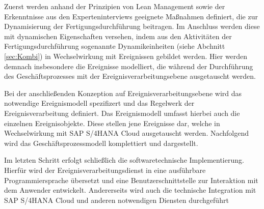\newpage

Zuerst werden anhand der Prinzipien von Lean Management sowie der Erkenntnisse aus den Experteninterviews geeignete Maßnahmen definiert, die zur Dynamisierung der Fertigungsdurchführung beitragen.
Im Anschluss werden diese mit dynamischen Eigenschaften versehen, indem aus den Aktivitäten der Fertigungsdurchführung sogenannte Dynamikeinheiten (siehe Abchnitt \ref{sec:Kombi}) in Wechselwirkung mit Ereignissen gebildet werden. Hier werden demnach insbesondere die Ereignisse modelliert, die während der Durchführung des Geschäftsprozesses mit der Ereignisverarbeitungsebene ausgetauscht werden.

Bei der anschließenden Konzeption auf Ereignisverarbeitungsebene  wird das notwendige Ereignismodell spezifizert und das Regelwerk der Ereignisverarbeitung definiert. Das Ereignismodell umfasst hierbei auch die einzelnen Ereignisobjekte. Diese stellen jene Ereignisse dar, welche in Wechselwirkung mit SAP S/4HANA Cloud ausgetauscht werden. Nachfolgend wird das Geschäftsprozessmodell komplettiert und dargestellt.

Im letzten Schritt erfolgt schließlich die softwaretechnische Implementierung. Hierfür wird der Ereignisverarbeitungsdienst in eine ausführbare Programmiersprache übersetzt und eine Benutzerschnittstelle zur Interaktion mit dem Anwender entwickelt. Andererseits wird auch die technische Integration mit SAP S/4HANA Cloud und anderen notwendigen Diensten durchgeführt 